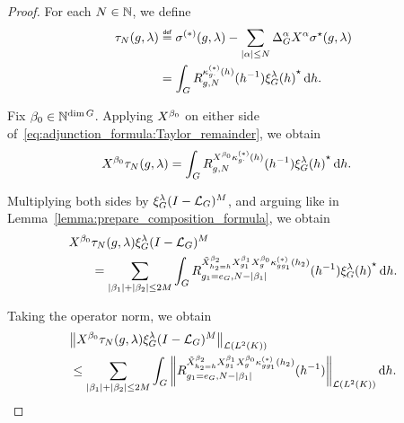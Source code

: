 \begin{proof}
    For each $N \in \mathbb{N}$,
    we define
    \begin{align}
        \tau_N(g, \lambda) &\defeq
        \sigma^{(*)}(g, \lambda)
        - \sum_{\abs \alpha \leq N} \DifferenceOperatorOrder \alpha \LeftDifferentialOperator \alpha \adj \sigma(g, \lambda) \notag\\
        &= \int_\Group \TaylorRemainder {\kappa_{g \dummy}^{(*)}(h)} g N (h^{-1}) \adj{\Rep \lambda (h)} \dd h.
        \label{eq:adjunction_formula:Taylor_remainder}
    \end{align}

    Fix $\beta_0 \in \mathbb{N}^{\dim G}$.
    Applying $\LeftDifferentialOperator {\beta_0}$ on either side of~\eqref{eq:adjunction_formula:Taylor_remainder},
    we obtain
    \begin{align*}
        \LeftDifferentialOperator {\beta_0} \tau_N (g, \lambda)
        &= \int_\Group \TaylorRemainder {\LeftDifferentialOperator {\beta_0} \kappa_{g \dummy}^{(*)}(h)} g N (h^{-1}) \adj{\Rep \lambda (h)} \dd h.
    \end{align*}

    Multiplying both sides by $\xi^{\lambda}_{G} (I - {\mathcal{L}_{G}})^{M}$,
    and arguing like in Lemma~\ref{lemma:prepare_composition_formula},
    we obtain
    \begin{align*}
        \LeftDifferentialOperator {\beta_0} &\tau_N (g, \lambda) \Rep \lambda \BesselPotentialSquared M\\
        &= \sum_{\abs {\beta_1} + \abs {\beta_2} \leq 2M} \int_\Group \TaylorRemainder {\RightDifferentialOperator [h_2 = h] {\beta_2} \LeftDifferentialOperator [g_1] {\beta_1} \LeftDifferentialOperator [g] {\beta_0} \kappa_{g g_1}^{(*)}(h_2)} {g_1 = e_\Group} {N - \abs {\beta_1}} (h^{-1}) \adj{\Rep \lambda (h)} \dd h.
    \end{align*}

    Taking the operator norm,
    we obtain
    \begin{align*}
        &\norm [\Lin {\Lebesgue 2 \CompactGroup}] {%
            \LeftDifferentialOperator {\beta_0} \tau_N (g, \lambda) \Rep \lambda \BesselPotentialSquared M
        }\\
        &\leq \sum_{\abs {\beta_1} + \abs {\beta_2} \leq 2M} \int_\Group
        \norm [\Lin {\Lebesgue 2 \CompactGroup}] {%
            \TaylorRemainder {\RightDifferentialOperator [h_2 = h] {\beta_2} \LeftDifferentialOperator [g_1] {\beta_1} \LeftDifferentialOperator [g] {\beta_0} \kappa_{g g_1}^{(*)}(h_2)} {g_1 = e_\Group} {N - \abs {\beta_1}} (h^{-1})
        }
        \dd h.
    \end{align*}


\end{proof}
